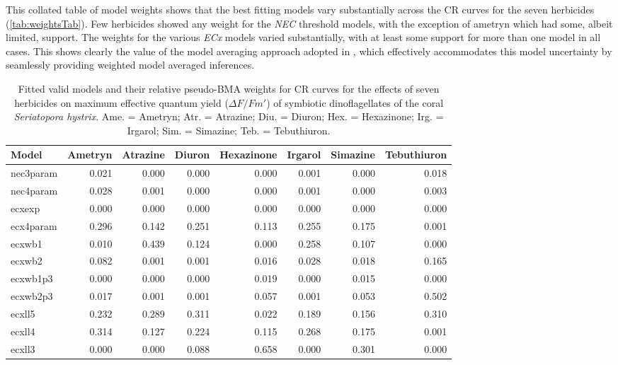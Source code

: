 \documentclass[
  shortnames]{jss}
\begin{document}
This collated table of model weights shows that the best fitting models vary substantially across the CR curves for the seven herbicides (\autoref{tab:weightsTab}). Few herbicides showed any weight for the \emph{NEC} threshold models, with the exception of ametryn which had some, albeit limited, support. The weights for the various \emph{ECx} models varied substantially, with at least some support for more than one model in all cases. This shows clearly the value of the model averaging approach adopted in , which effectively accommodates this model uncertainty by seamlessly providing weighted model averaged inferences.

\begin{CodeChunk}
\begin{table}

\caption{\label{tab:weightsTab}Fitted valid models and their relative pseudo-BMA weights for CR curves for the effects of seven herbicides on maximum effective quantum yield ($\Delta F / Fm'$) of symbiotic dinoflagellates of the coral \textit{Seriatopora hystrix}. Ame. = Ametryn; Atr. = Atrazine; Diu. = Diuron; Hex. = Hexazinone; Irg. = Irgarol; Sim. = Simazine; Teb. = Tebuthiuron.}
\centering
\begin{tabular}[t]{l|r|r|r|r|r|r|r}
\hline
Model & Ametryn & Atrazine & Diuron & Hexazinone & Irgarol & Simazine & Tebuthiuron\\
\hline
nec3param & 0.021 & 0.000 & 0.000 & 0.000 & 0.001 & 0.000 & 0.018\\
\hline
nec4param & 0.028 & 0.001 & 0.000 & 0.000 & 0.001 & 0.000 & 0.003\\
\hline
ecxexp & 0.000 & 0.000 & 0.000 & 0.000 & 0.000 & 0.000 & 0.000\\
\hline
ecx4param & 0.296 & 0.142 & 0.251 & 0.113 & 0.255 & 0.175 & 0.001\\
\hline
ecxwb1 & 0.010 & 0.439 & 0.124 & 0.000 & 0.258 & 0.107 & 0.000\\
\hline
ecxwb2 & 0.082 & 0.001 & 0.001 & 0.016 & 0.028 & 0.018 & 0.165\\
\hline
ecxwb1p3 & 0.000 & 0.000 & 0.000 & 0.019 & 0.000 & 0.015 & 0.000\\
\hline
ecxwb2p3 & 0.017 & 0.001 & 0.001 & 0.057 & 0.001 & 0.053 & 0.502\\
\hline
ecxll5 & 0.232 & 0.289 & 0.311 & 0.022 & 0.189 & 0.156 & 0.310\\
\hline
ecxll4 & 0.314 & 0.127 & 0.224 & 0.115 & 0.268 & 0.175 & 0.001\\
\hline
ecxll3 & 0.000 & 0.000 & 0.088 & 0.658 & 0.000 & 0.301 & 0.000\\
\hline
\end{tabular}
\end{table}

\end{CodeChunk}
\end{document}
